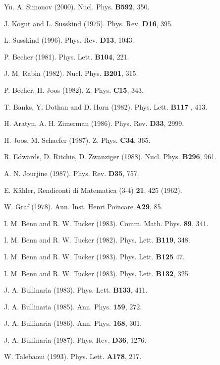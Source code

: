 \documentclass[a4paper,12pt]{article}
\begin{document}
\begin{thebibliography}{99}
  Yu. A. Simonov (2000). Nucl. Phys. \textbf{B592}, 350.

  J. Kogut and L. Susskind (1975). Phys. Rev. \textbf{D16}, 395.

  L. Susskind (1996). Phys. Rev. \textbf{D13}, 1043.

  P. Becher (1981). Phys. Lett. \textbf{B104}, 221.

  J. M. Rabin (1982). Nucl. Phys. \textbf{B201}, 315.

  P. Becher, H. Joos (1982). Z. Phys. \textbf{C15}, 343.

  T. Banks, Y. Dothan and D. Horn (1982). Phys. Lett. \textbf{B117
}, 413.

  H. Aratyn, A. H. Zimerman (1986). Phys. Rev. \textbf{D33}, 2999.

  H. Joos, M. Schaefer (1987). Z. Phys. \textbf{C34}, 365.

  R. Edwards, D. Ritchie, D. Zwanziger (1988). Nucl. Phys.
\textbf{B296}, 961.

  A. N. Jourjine (1987). Phys. Rev. \textbf{D35}, 757.

  E. K\"ahler, Rendiconti di Matematica (3-4) \textbf{21}, 425
(1962).

  W. Graf (1978). Ann. Inst. Henri Poincare \textbf{A29}, 85.

  I. M. Benn and R. W. Tucker (1983). Comm. Math. Phys. \textbf{
89}, 341.

  I. M. Benn and R. W. Tucker (1982). Phys. Lett. \textbf{B119},
348.

  I. M. Benn and R. W. Tucker (1983). Phys. Lett. \textbf{B125}
47.

  I. M. Benn and R. W. Tucker (1983). Phys. Lett. \textbf{B132},
325.

  J. A. Bullinaria (1983). Phys. Lett. \textbf{B133}, 411.

  J. A. Bullinaria (1985). Ann. Phys. \textbf{159}, 272.

  J. A. Bullinaria (1986). Ann. Phys. \textbf{168}, 301.

  J. A. Bullinaria (1987). Phys. Rev. \textbf{D36}, 1276.

  W. Talebaoui (1993). Phys. Lett. \textbf{A178}, 217.


\end{thebibliography}
\end{document}
